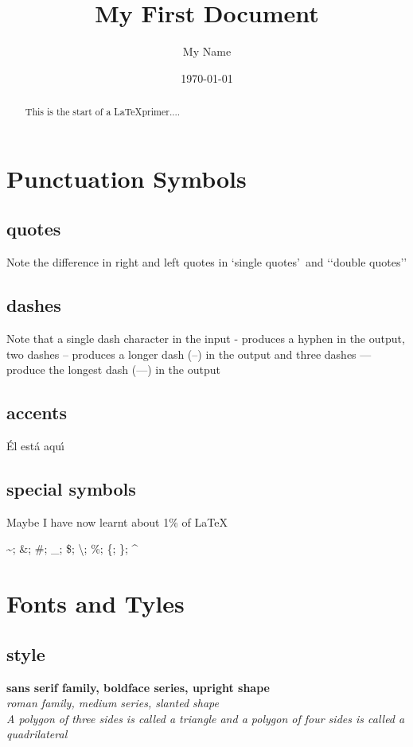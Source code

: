 \documentclass{article}
\begin{document}
\title{My First Document}
\author{My Name}
\date{\today}
\maketitle



\begin{abstract}
  This is the start of a \LaTeX primer....
\end{abstract}

\section{Punctuation Symbols}
\subsection{quotes}
Note the difference in right and left quotes in \lq single
quotes\rq\ and \lq\lq double quotes\rq\rq


\subsection{dashes}
Note that a single dash character in the input - produces a hyphen in the output, two
dashes -- produces a longer dash (--) in the output and three dashes --- produce the
longest dash (---) in the output


\subsection{accents}
\'{E}l est\'{a} aqu\'{\i}


\subsection{special symbols}
Maybe I have now learnt about 1\% of \LaTeX

\textasciitilde; \&; \#; \_; \$; \textbackslash; \%; \{; \}; \textasciicircum



\section{Fonts and Tyles}

\subsection{style}
\textsf{\textbf{sans serif family, boldface series, upright shape}}\\
\textrm{\textsl{roman family, medium series, slanted shape}}\\
\textit{A polygon of three sides is called a \emph{triangle} and a
polygon of four sides is called a \emph{quadrilateral}}
\end{document}
